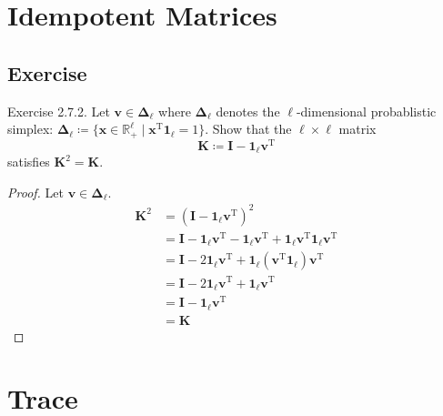 \documentclass{article}
\theoremstyle{plain}
\begin{document}
\section{Idempotent Matrices}

\subsection{Exercise}

\begin{itembox}[l]{Exercise 2.7.2.}
	Let
	\begin{math}
		\bm{v} \in \bm{\Delta}_{\ell}
	\end{math}
	where $\bm{\Delta}_\ell$ denotes the $\ell$-dimensional probablistic simplex:
	\begin{math}
		\bm{\Delta}_\ell \coloneq \{\bm{x} \in \mathbb{R}_+^{\ell} \mid \bm{x}^\mathrm{T} \bm{1}_{\ell} = 1\} .
	\end{math}
	Show that the $\ell \times \ell$ matrix
	\begin{equation*}
		\bm{K} \coloneq \bm{I} - \bm{1}_{\ell} \bm{v}^\mathrm{T}
	\end{equation*}
	satisfies $\bm{K}^2 = \bm{K} .$
\end{itembox}

\begin{proof}
	Let
	\begin{math}
		\bm{v} \in \bm{\Delta}_{\ell} .
	\end{math}
	\begin{equation*}
		\begin{split}
			\bm{K}^2 &= (\bm{I} - \bm{1}_{\ell} \bm{v}^\mathrm{T})^2 \\
			&= \bm{I} - \bm{1}_{\ell} \bm{v}^\mathrm{T} - \bm{1}_{\ell} \bm{v}^\mathrm{T} + \bm{1}_{\ell} \bm{v}^\mathrm{T} \bm{1}_{\ell} \bm{v}^\mathrm{T} \\
			&= \bm{I} - 2 \bm{1}_{\ell} \bm{v}^\mathrm{T} + \bm{1}_{\ell} (\bm{v}^\mathrm{T} \bm{1}_{\ell}) \bm{v}^\mathrm{T} \\
			&= \bm{I} - 2 \bm{1}_{\ell} \bm{v}^\mathrm{T} + \bm{1}_{\ell} \bm{v}^\mathrm{T} \\
			&= \bm{I} - \bm{1}_{\ell} \bm{v}^\mathrm{T} \\
			&= \bm{K}
		\end{split}
	\end{equation*}
\end{proof}


\section{Trace}
\end{document}
